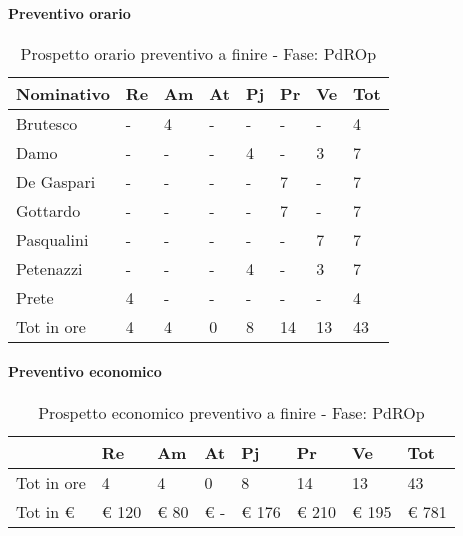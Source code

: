 			\paragraph{Preventivo orario}
								\begin{table}[H] \begin{center} \begin{tabular}{llllllll}
										\toprule
										\textbf{Nominativo}	&	\textbf{Re}	&	\textbf{Am}	&	\textbf{At}	&	\textbf{Pj}	&	\textbf{Pr}	&	\textbf{Ve}	&	\textbf{Tot}	 \\
										\midrule
										Brutesco	&	-	&	4	&	-	&	-	&	-	&	-	&	4	 \\
										Damo	&	-	&	-	&	-	&	4	&	-	&	3	&	7	 \\
										De Gaspari	&	-	&	-	&	-	&	-	&	7	&	-	&	7	 \\
										Gottardo	&	-	&	-	&	-	&	-	&	7	&	-	&	7	 \\
										Pasqualini	&	-	&	-	&	-	&	-	&	-	&	7	&	7	 \\
										Petenazzi	&	-	&	-	&	-	&	4	&	-	&	3	&	7	 \\
										Prete	&	4	&	-	&	-	&	-	&	-	&	-	&	4	 \\
										\midrule
										Tot in ore	&	4	&	4	&	0	&	8	&	14	&	13	&	43	 \\



										\bottomrule
										\end{tabular} \end{center} \caption{Prospetto orario preventivo a finire - Fase:
										PdROp
										} \end{table}

			\paragraph{Preventivo economico}
										\begin{table}[H] \begin{center} \begin{tabular}{llllllll}
										\toprule
											&	\textbf{Re}	&	\textbf{Am}	&	\textbf{At}	&	\textbf{Pj}	&	\textbf{Pr}	&	\textbf{Ve}	&	\textbf{Tot}	 \\

										\midrule
										Tot in ore	&	4	&	4	&	0	&	8	&	14	&	13	&	43	 \\


										Tot in €	&	 €           120 	 & 	 €          80 	 & 	 €               -   	 & 	 €        176 	 & 	 €            210 	 & 	 €        195 	 & 	 €                 781 	 \\
										\bottomrule
										\end{tabular} \end{center} \caption{Prospetto economico preventivo a finire - Fase:
										PdROp
										} \end{table}
